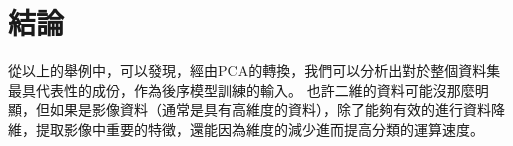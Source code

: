 \begin{itemize}
\end{itemize}


\section {結論}
從以上的舉例中，可以發現，經由PCA的轉換，我們可以分析出對於整個資料集最具代表性的成份，作為後序模型訓練的輸⼊。
也許二維的資料可能沒那麼明顯，但如果是影像資料（通常是具有高維度的資料），除了能夠有效的進行資料降維，提取影像中重要的特徵，還能因為維度的減少進而提高分類的運算速度。

